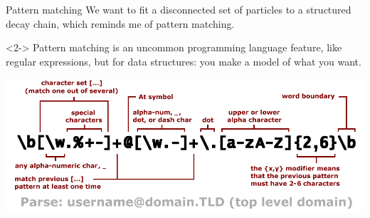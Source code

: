 \documentclass[aspectratio=169]{beamer}
\begin{document}
\begin{frame}{Pattern matching}
\Large
\vspace{0.35 cm}
We want to fit a disconnected set of particles to a structured decay chain, which reminds me of pattern matching.

\vspace{0.5 cm}
\large
\begin{uncoverenv}<2->
Pattern matching is an uncommon programming language feature, like regular expressions, but for data structures: you make a model of what you want.

\vspace{0.25 cm}
\begin{center}
\includegraphics[width=0.8\linewidth]{regex-example.png}
\end{center}
\end{uncoverenv}
\end{frame}
\end{document}
